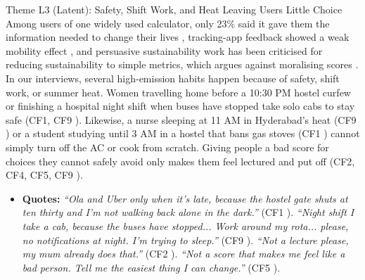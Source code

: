 \documentclass[12pt, a4paper]{article}
\begin{document}
\begin{latentcard}{Theme L3 (Latent): Safety, Shift Work, and Heat Leaving Users Little Choice}
Among users of one widely used calculator, only 23\% said it gave them the information needed to change their lives \cite{collins2020}, tracking-app feedback showed a weak mobility effect \cite{hoffmann2024}, and persuasive sustainability work has been criticised for reducing sustainability to simple metrics, which argues against moralising scores \cite{brynjarsdottir2012}. In our interviews, several high-emission habits happen because of safety, shift work, or summer heat. Women travelling home before a 10:30 PM hostel curfew or finishing a hospital night shift when buses have stopped take solo cabs to stay safe (CF1, CF9 \cite{cf1, cf9}). Likewise, a nurse sleeping at 11 AM in Hyderabad's heat (CF9 \cite{cf9}) or a student studying until 3 AM in a hostel that bans gas stoves (CF1 \cite{cf1}) cannot simply turn off the AC or cook from scratch. Giving people a bad score for choices they cannot safely avoid only makes them feel lectured and put off (CF2, CF4, CF5, CF9 \cite{cf2, cf4, cf5, cf9}).
\begin{itemize}
    \item \textbf{Quotes:} \textit{``Ola and Uber only when it's late, because the hostel gate shuts at ten thirty and I'm not walking back alone in the dark.''} (CF1 \cite{cf1}). \textit{``Night shift I take a cab, because the buses have stopped... Work around my rota... please, no notifications at night. I'm trying to sleep.''} (CF9 \cite{cf9}). \textit{``Not a lecture please, my mum already does that.''} (CF2 \cite{cf2}). \textit{``Not a score that makes me feel like a bad person. Tell me the easiest thing I can change.''} (CF5 \cite{cf5}).
\end{itemize}
\end{latentcard}
\end{document}
